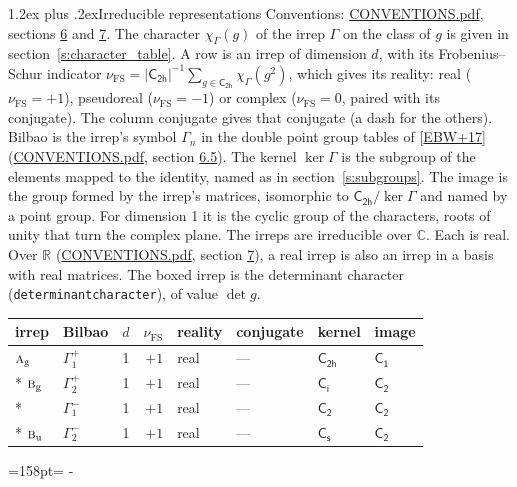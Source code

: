 \documentclass[10pt,a4paper]{article}
\makeatletter
\renewcommand\section{\@startsection{section}{1}{\z@}{-3ex plus -1ex minus -.2ex}%
  {1.2ex plus .2ex}{\normalfont\large\sffamily\bfseries\color{parttitle}}}
\newcommand{\needspace}[1]{\par\penalty-100\begingroup\dimen0=#1\relax\dimen2=\pagegoal
  \advance\dimen2-\pagetotal\ifdim\dimen0>\dimen2\relax\ifdim\dimen2>0pt\vfil\break\fi\fi
  \endgroup}
\numberwithin{equation}{section}
\newcommand{\grp}[1]{\mathsf{#1}}
\newcommand{\irr}[1]{\text{\normalfont\scshape #1}}
\newcommand{\detbox}[1]{{\setlength{\fboxsep}{1pt}\fbox{#1}}}
\newcommand{\ptag}[1]{\mathrm{#1}}
\newcommand{\irchar}[1]{\chi_{#1}}
\newcommand{\fsind}{\nu_{\mathrm{FS}}}
\makeatother
\begin{document}
\section{Irreducible representations}\label{s:irreps}
Conventions: \href{../../CONVENTIONS.pdf}{CONVENTIONS.pdf}, sections \href{../../CONVENTIONS.pdf\#conv.6}{6} and \href{../../CONVENTIONS.pdf\#conv.7}{7}.
\leavevmode\label{n:function.character}\label{n:irrep.Gamma}The character $\irchar{\Gamma}(g)$ of the irrep $\Gamma$ on the class of $g$ is given in section~\ref{s:character_table}.
\leavevmode\label{n:index.dimension}\label{n:index.frobenius}\label{n:head.irrep}\label{n:head.reality}A row is an irrep of dimension $d$, with its Frobenius--Schur indicator $\fsind = |\grp{C_{2h}}|^{-1}\allowbreak\sum_{g\in\grp{C_{2h}}}\irchar{\Gamma}(g^2)$, which gives its reality: real ($\fsind = +1$), pseudoreal ($\fsind = -1$) or complex ($\fsind = 0$, paired with its conjugate). \label{n:head.conjugate}The column conjugate gives that conjugate (a dash for the others). \label{n:head.bilbao}\label{n:irrep.alias.gamma}Bilbao is the irrep's symbol $\Gamma_n$ in the double point group tables of [\href{../../../REFERENCES.pdf\#ref.EBW+17}{EBW+17}] (\href{../../CONVENTIONS.pdf}{CONVENTIONS.pdf}, section \href{../../CONVENTIONS.pdf\#conv.6.5}{6.5}). \label{n:head.kernel}The kernel $\ker\Gamma$ is the subgroup of the elements mapped to the identity, named as in section~\ref{s:subgroups}. \label{n:head.image}The image is the group formed by the irrep's matrices, isomorphic to $\grp{C_{2h}}/\ker\Gamma$ and named by a point group. For dimension 1 it is the cyclic group of the characters, roots of unity that turn the complex plane. The irreps are irreducible over $\mathbb{C}$. Each is real. Over $\mathbb{R}$ (\href{../../CONVENTIONS.pdf}{CONVENTIONS.pdf}, section \href{../../CONVENTIONS.pdf\#conv.7}{7}), a real irrep is also an irrep in a basis with real matrices. \label{n:mark.determinant}The boxed irrep is the determinant character (\texttt{determinantcharacter}), of value $\det g$.
\setlength{\emergencystretch}{2em}\par\setlength{\emergencystretch}{0pt}
{\small\renewcommand{\arraystretch}{1.25}\begin{longtable}{@{}llrrllll@{}}\toprule
irrep & Bilbao & $d$ & $\fsind$ & reality & conjugate & kernel & image\\\midrule\endhead
\bottomrule\endfoot\endlastfoot
$\irr{a}_{\ptag{g}}$ & $\Gamma_{1}^{+}$ & 1 & $+1$ & real & --- & \href{C2h.pdf}{$\grp{C_{2h}}$} & \href{C1.pdf}{$\grp{C_{1}}$}\\*
$\irr{b}_{\ptag{g}}$ & $\Gamma_{2}^{+}$ & 1 & $+1$ & real & --- & \href{S2.pdf}{$\grp{C_{i}}$} & \href{C2.pdf}{$\grp{C_{2}}$}\\*
\detbox{$\irr{a}_{\ptag{u}}$} & $\Gamma_{1}^{-}$ & 1 & $+1$ & real & --- & \href{C2.pdf}{$\grp{C_{2}}$} & \href{C2.pdf}{$\grp{C_{2}}$}\\*
$\irr{b}_{\ptag{u}}$ & $\Gamma_{2}^{-}$ & 1 & $+1$ & real & --- & \href{C1v.pdf}{$\grp{C_{s}}$} & \href{C2.pdf}{$\grp{C_{2}}$}\\
\bottomrule\end{longtable}}
\needspace{158pt}
\end{document}
